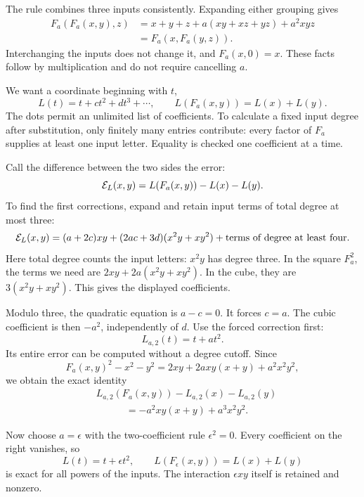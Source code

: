The rule combines three inputs consistently. Expanding either grouping gives
\begin{align*}
 F_a(F_a(x,y),z)
 &=x+y+z+a(xy+xz+yz)+a^2xyz\\
 &=F_a(x,F_a(y,z)).
\end{align*}
Interchanging the inputs does not change it, and \(F_a(x,0)=x\). These facts follow by multiplication and do not require cancelling \(a\).

We want a coordinate beginning with \(t\),
\begin{equation}\label{eq:log-identity}
 L(t)=t+c t^2+d t^3+\cdots,
 \qquad L(F_a(x,y))=L(x)+L(y).
\end{equation}
The dots permit an unlimited list of coefficients. To calculate a fixed input degree after substitution, only finitely many entries contribute: every factor of \(F_a\) supplies at least one input letter. Equality is checked one coefficient at a time.

Call the difference between the two sides the error:
\[
 \mathcal E_L(x,y)=L(F_a(x,y))-L(x)-L(y).
\]
To find the first corrections, expand and retain input terms of total degree at most three:
\begin{equation}\label{eq:first-coefficients}
 \mathcal E_L(x,y)
 =(a+2c)xy+(2ac+3d)(x^2y+xy^2)
 +\text{terms of degree at least four}.
\end{equation}
Here total degree counts the input letters: \(x^2y\) has degree three. In the square \(F_a^2\), the terms we need are \(2xy+2a(x^2y+xy^2)\). In the cube, they are \(3(x^2y+xy^2)\). This gives the displayed coefficients.

Modulo three, the quadratic equation is \(a-c=0\). It forces \(c=a\). The cubic coefficient is then \(-a^2\), independently of \(d\). Use the forced correction first:
\[
 L_{a,2}(t)=t+at^2.
\]
Its entire error can be computed without a degree cutoff. Since
\[
 F_a(x,y)^2-x^2-y^2
 =2xy+2a xy(x+y)+a^2x^2y^2,
\]
we obtain the exact identity
\begin{equation}\label{eq:exact-char3-defect}
 \begin{split}
 &L_{a,2}(F_a(x,y))-L_{a,2}(x)-L_{a,2}(y)\\
 &\hspace{3em}=-a^2xy(x+y)+a^3x^2y^2.
 \end{split}
\end{equation}

Now choose \(a=\epsilon\) with the two-coefficient rule \(\epsilon^2=0\). Every coefficient on the right vanishes, so
\begin{equation}\label{eq:dual-repair}
 L(t)=t+\epsilon t^2,
 \qquad L(F_\epsilon(x,y))=L(x)+L(y)
\end{equation}
is exact for all powers of the inputs. The interaction \(\epsilon xy\) itself is retained and nonzero.

